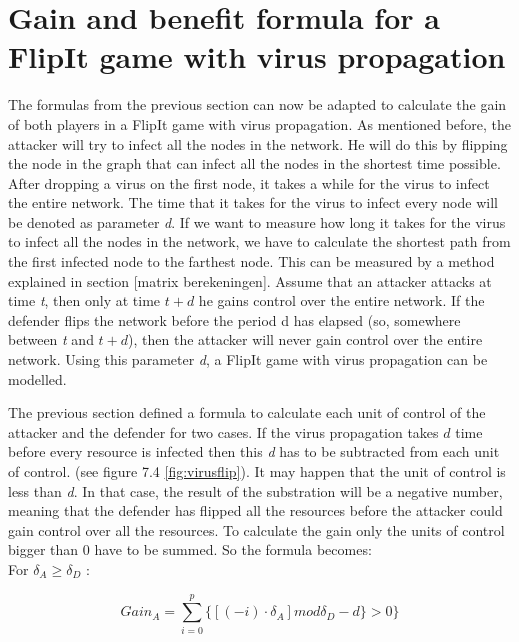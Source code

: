 \section{Gain and benefit formula for a FlipIt game with virus propagation}
\label{ch:8:GainVirus}
The formulas from the previous section can now be adapted to calculate the gain of both players in a FlipIt game with virus propagation. As mentioned before, the attacker will try to infect all the nodes in the network. He will do this by flipping the node in the graph that can infect all the nodes in the shortest time possible. After dropping a virus on the first node, it takes a while for the virus to infect the entire network. The time that it takes for the virus to infect every node will be denoted as parameter \textit{d}. If we want to measure how long it takes for the virus to infect all the nodes in the network, we have to calculate the shortest path from the
first infected node to the farthest node. This can be measured by a method explained in section [matrix berekeningen]. Assume that an attacker attacks at time \textit{t}, then only at time $t+d$ he gains control over the entire network. If the defender flips the network before the period d has elapsed (so, somewhere between \textit{t} and $t+d$), then the attacker will never gain control over the entire network. Using this parameter \textit{d}, a FlipIt game with virus propagation can be modelled.

The previous section defined a formula to calculate each unit of control of the attacker and the defender for two cases. If the virus propagation takes $d$ time before every resource is infected then this \textit{d} has to be subtracted from each unit of control. (see figure 7.4 \ref{fig:virusflip}). It may happen that the unit of control is less than \textit{d}. In that case, the result of the substration will be a negative number, meaning that the defender has flipped all the resources before the attacker could gain control over all the resources. To calculate the gain only the units of control bigger than 0 have to be summed. So the formula becomes: \\


For $\delta_{A} \geq \delta_{D}$ :

\begin{equation}\label{first}
Gain_{A} = \sum_{i=0}^{p} \lbrace [( - i ) \cdot \delta_{A}] mod \delta_{D} - d \rbrace  > 0 \rbrace 
\end{equation}

